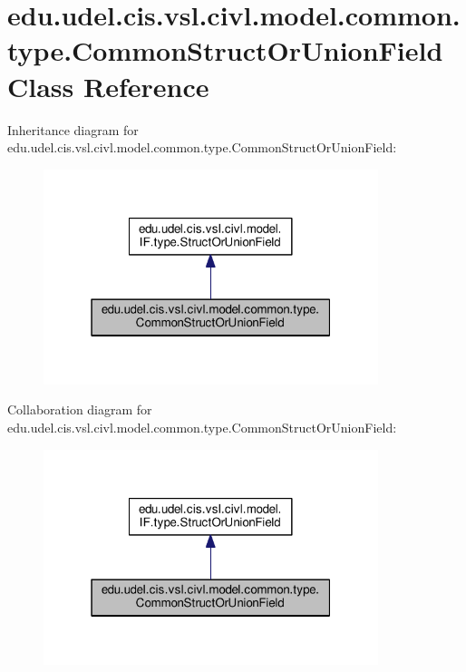 \hypertarget{classedu_1_1udel_1_1cis_1_1vsl_1_1civl_1_1model_1_1common_1_1type_1_1CommonStructOrUnionField}{}\section{edu.\+udel.\+cis.\+vsl.\+civl.\+model.\+common.\+type.\+Common\+Struct\+Or\+Union\+Field Class Reference}
\label{classedu_1_1udel_1_1cis_1_1vsl_1_1civl_1_1model_1_1common_1_1type_1_1CommonStructOrUnionField}


Inheritance diagram for edu.\+udel.\+cis.\+vsl.\+civl.\+model.\+common.\+type.\+Common\+Struct\+Or\+Union\+Field\+:
\nopagebreak
\begin{figure}[H]
\begin{center}
\leavevmode
\includegraphics[width=277pt]{classedu_1_1udel_1_1cis_1_1vsl_1_1civl_1_1model_1_1common_1_1type_1_1CommonStructOrUnionField__inherit__graph}
\end{center}
\end{figure}


Collaboration diagram for edu.\+udel.\+cis.\+vsl.\+civl.\+model.\+common.\+type.\+Common\+Struct\+Or\+Union\+Field\+:
\nopagebreak
\begin{figure}[H]
\begin{center}
\leavevmode
\includegraphics[width=277pt]{classedu_1_1udel_1_1cis_1_1vsl_1_1civl_1_1model_1_1common_1_1type_1_1CommonStructOrUnionField__coll__graph}
\end{center}
\end{figure}
